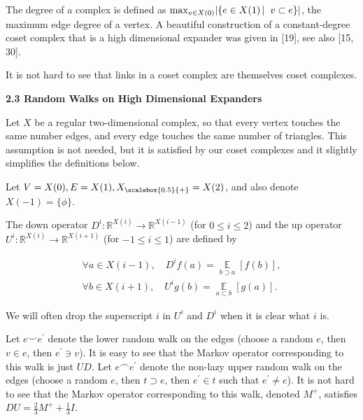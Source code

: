 \documentclass[10pt,a4paper]{article}
\begin{document}



The degree of a complex is defined as $\max_{v\in X(0)}\lvert\left\{e\in X(1)\left|\;\vphantom{e\in X(1)v\subset e}\right.v\subset e\right\}\rvert$, the maximum edge degree of a vertex. A beautiful construction of a constant-degree coset complex that is a high dimensional expander was given in [19], see also [15, 30].\par




It is not hard to see that links in a coset complex are themselves coset complexes.\par





\par\medskip\noindent\textbf{
2.3 Random Walks on High Dimensional Expanders}\par




Let $X$ be a regular two-dimensional complex, so that every vertex touches the same number edges, and every edge touches the same number of triangles. This assumption is not needed, but it is satisfied by our coset complexes and it slightly simplifies the definitions below.\par




Let $V=X(0),E=X(1),{X}_{\scalebox{0.5}{+}}=X(2)$, and also denote $X(-1)=\{\phi\}$.\par




The down operator $D^{i}:\mathbb{R}^{X(i)}\to\mathbb{R}^{X(i-1)}$ (for $0\leq i\leq 2$) and the up operator $U^{i}:\mathbb{R}^{X(i)}\to\mathbb{R}^{X(i+1)}$ (for $-1\leq i\leq 1$) are defined by\par


\[\begin{gathered}
\displaystyle\forall a\in X(i-1),\quad D^{i}f(a) \displaystyle=\operatorname*{\mathbb{E}}_{b\supset a}[f(b)], \\
\displaystyle\forall b\in X(i+1),\quad U^{i}g(b) \displaystyle=\operatorname*{\mathbb{E}}_{a\subset b}[g(a)].
\end{gathered}\]


We will often drop the superscript $i$ in $U^{i}$ and $D^{i}$ when it is clear what $i$ is.\par




Let $e\smallsmile e^{\prime}$ denote the lower random walk on the edges (choose a random $e$, then $v\in e$, then $e^{\prime}\ni v$). It is easy to see that the Markov operator corresponding to this walk is just $UD$.
Let $e\smallfrown e^{\prime}$ denote the non-lazy upper random walk on the edges (choose a random $e$, then $t\supset e$, then $e^{\prime}\in t$ such that $e^{\prime}\neq e$). It is not hard to see that the Markov operator corresponding to this walk, denoted $M^{+}$, satisfies $DU=\frac{2}{3}M^{+}+\frac{1}{3}I$.\par
\end{document}
